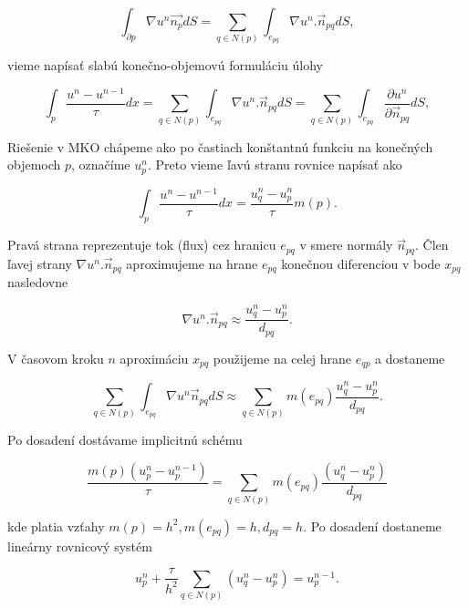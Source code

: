 \documentclass[a4paper,11pt,twoside]{article}%
\begin{document}
\begin{equation} 
\int_{\partial p} \nabla u^n \vec{n_p}dS = \sum_{q\in N(p)}\int_{e_{pq}} \nabla u^n . \vec{n}_{pq}dS,
\end{equation}

vieme napísať slabú konečno-objemovú formuláciu úlohy

\begin{equation} 
\int_p\frac{u^n - u^{n-1}}{\tau} dx = \sum_{q\in N(p)}\int_{e_{pq}} \nabla u^n . \vec{n}_{pq}dS = \sum_{q\in N(p)}\int_{e_{pq}} \frac{\partial u^n}{\partial \vec{n}_{pq}} dS,
\end{equation}

Riešenie v MKO chápeme ako po častiach konštantnú funkciu na konečných objemoch $p$, označíme $u_p^n$. Preto vieme ľavú stranu rovnice napísať ako 

\begin{equation} 
\int_p\frac{u^n - u^{n-1}}{\tau} dx = \frac{u^n_q - u^n_p}{\tau} m(p).
\end{equation}

Pravá strana reprezentuje tok (flux) cez hranicu $e_{pq}$ v smere normály $\vec{n}_{pq}$. Člen ľavej strany $\nabla u^n . \vec{n}_{pq}$ aproximujeme na hrane $e_{pq}$ konečnou diferenciou v bode $x_{pq}$ nasledovne

\begin{equation}
\nabla u^n . \vec{n}_{pq} \approx \frac{u^n_q - u^n_p}{d_{pq}}.
\end{equation}

V časovom kroku $n$ aproximáciu $x_{pq}$ použijeme na celej hrane $e_{qp}$ a dostaneme

\begin{equation}
\sum_{q\in N(p)} \int_{e_{pq}} \nabla u^n \vec{n}_{pq} dS \approx \sum_{q\in N(p)} m(e_{pq})\frac{u^n_q - u^n_p}{d_{pq}}.
\end{equation}

Po dosadení dostávame implicitnú schému  

\begin{equation}
\frac{m(p)(u_p^n -u_p^{n - 1})}{\tau} = \sum_{q \in N(p)} m(e_{pq})\frac{(u_q^n - u_p^n)}{d_{pq}}
\end{equation}

kde platia vzťahy $m(p) = h^2, m(e_{pq}) = h, d_{pq} = h$. Po dosadení dostaneme lineárny rovnicový systém

\begin{equation}
u_p^n + \frac{\tau}{h^2}\sum_{q \in N(p)} (u_q^n - u_p^n) = u_p^{n - 1}.
\end{equation}
\end{document}

